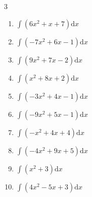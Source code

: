 \begin{multicols}{3}
\begin{enumerate}

\columnbreak %

  \item $\displaystyle \int \left( 6x^{2}+x+7 \right) \mathrm{d}x$


  \item $\displaystyle \int \left( -7x^{2}+6x-1 \right) \mathrm{d}x$


  \item $\displaystyle \int \left( 9x^{2}+7x-2 \right) \mathrm{d}x$


  \item $\displaystyle \int \left( x^{2}+8x+2 \right) \mathrm{d}x$


  \item $\displaystyle \int \left( -3x^{2}+4x-1 \right) \mathrm{d}x$


  \item $\displaystyle \int \left( -9x^{2}+5x-1 \right) \mathrm{d}x$


  \item $\displaystyle \int \left( -x^{2}+4x+4 \right) \mathrm{d}x$


  \item $\displaystyle \int \left( -4x^{2}+9x+5 \right) \mathrm{d}x$


  \item $\displaystyle \int \left( x^{2}+3 \right) \mathrm{d}x$


  \item $\displaystyle \int \left( 4x^{2}-5x+3 \right) \mathrm{d}x$


\end{enumerate}
\end{multicols}
